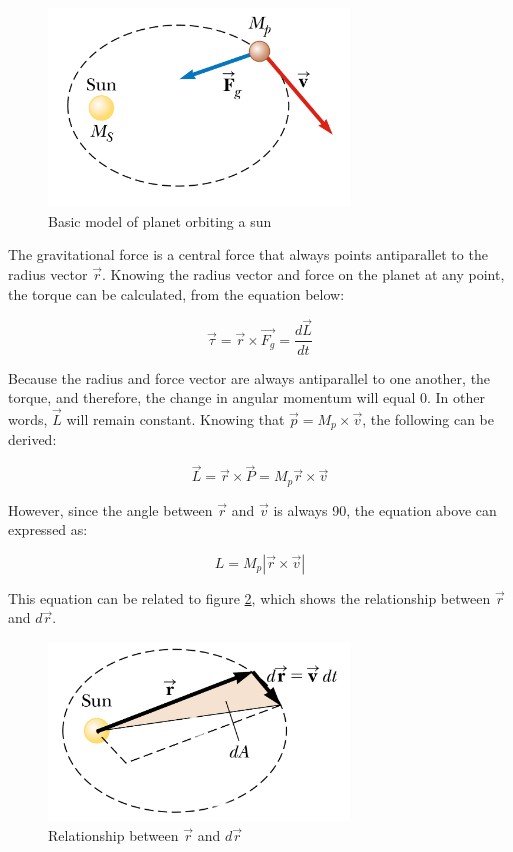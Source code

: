 \begin{figure}[h] 
	\centering
		\includegraphics[width=8cm]{Figures/sun1.png}
	\caption{Basic model of planet orbiting a sun}
	\label{fig:sun1}
\end{figure}


The gravitational force is a central force that always points antiparallet to the radius vector $\vec{r}$.  Knowing the radius vector and force on the planet at any point, the torque can be calculated, from the equation below:

\begin{equation}\label{eq:torque}
\vec{\tau} = \vec{r}\times\vec{F_g} = \frac{d\vec{L}}{dt}
\end{equation}


Because the radius and force vector are always antiparallel to one another, the torque, and therefore, the change in angular momentum will equal 0.  In other words, $\vec{L}$ will remain constant.  Knowing that $\vec{p} = M_p \times \vec{v}$, the following can be derived:

$$ \vec{L} = \vec{r}\times \vec{P} = M_p \vec{r}\times\vec{v}  $$

However, since the angle between $\vec{r}$ and $\vec{v}$ is always 90\textdegree, the equation above can expressed as:


\begin{equation}\label{eq:torquederive}
L = M_p \left|\vec{r} \times \vec{v}\right|
\end{equation}

This equation can be related to figure \ref{fig:sun2}, which shows the relationship between $\vec{r}$ and $d\vec{r}$.

\begin{figure}[h] 
	\centering
		\includegraphics[width=8cm]{Figures/sun2.png}
	\caption{Relationship between  $\vec{r}$ and $d\vec{r}$}
	\label{fig:sun2}
\end{figure}

